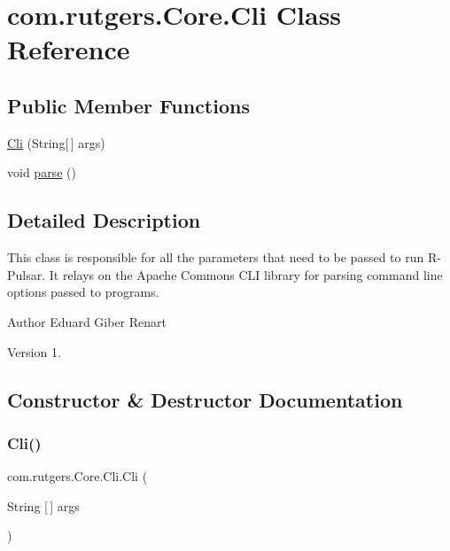 \hypertarget{classcom_1_1rutgers_1_1Core_1_1Cli}{}\section{com.\+rutgers.\+Core.\+Cli Class Reference}
\label{classcom_1_1rutgers_1_1Core_1_1Cli}
\subsection*{Public Member Functions}
\begin{DoxyCompactItemize}
\item 
\hyperlink{classcom_1_1rutgers_1_1Core_1_1Cli_a7ae0ec5565a0f5bf6131451f07328d95}{Cli} (String\mbox{[}$\,$\mbox{]} args)
\item 
void \hyperlink{classcom_1_1rutgers_1_1Core_1_1Cli_aaee909416b9655051fbea7611b41d1d4}{parse} ()
\end{DoxyCompactItemize}


\subsection{Detailed Description}
This class is responsible for all the parameters that need to be passed to run R-\/\+Pulsar. It relays on the Apache Commons C\+LI library for parsing command line options passed to programs.

\begin{DoxyAuthor}{Author}
Eduard Giber Renart 
\end{DoxyAuthor}
\begin{DoxyVersion}{Version}
1. 
\end{DoxyVersion}


\subsection{Constructor \& Destructor Documentation}
\mbox{\label{classcom_1_1rutgers_1_1Core_1_1Cli_a7ae0ec5565a0f5bf6131451f07328d95}} 
\subsubsection{\texorpdfstring{Cli()}{Cli()}}
{\footnotesize\ttfamily com.\+rutgers.\+Core.\+Cli.\+Cli (\begin{DoxyParamCaption}\item[{String \mbox{[}$\,$\mbox{]}}]{args }\end{DoxyParamCaption})}

